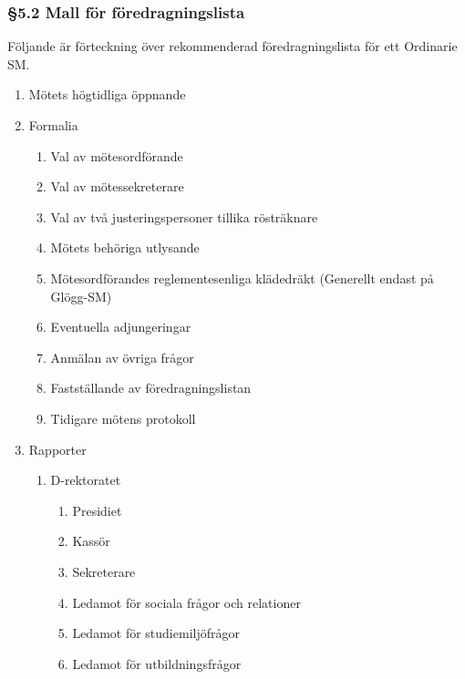 \subsubsection{§5.2 Mall för föredragningslista}

Följande är förteckning över rekommenderad föredragningslista för ett Ordinarie SM.

\begin{enumerate}
  \item Mötets högtidliga öppnande
  \item Formalia\begin{enumerate}
  \item Val av mötesordförande
  \item Val av mötessekreterare
  \item Val av två justeringspersoner tillika rösträknare
  \item Mötets behöriga utlysande
  \item Mötesordförandes reglementesenliga klädedräkt (Generellt endast på Glögg-SM)
  \item Eventuella adjungeringar
  \item Anmälan av övriga frågor
  \item Fastställande av föredragningslistan
  \item Tidigare mötens protokoll
\end{enumerate}


  \item Rapporter\begin{enumerate}
  \item D-rektoratet\begin{enumerate}
  \item Presidiet
  \item Kassör
  \item Sekreterare
  \item Ledamot för sociala frågor och relationer
  \item Ledamot för studiemiljöfrågor
  \item Ledamot för utbildningsfrågor
\end{enumerate}



\end{enumerate}
\end{enumerate}
